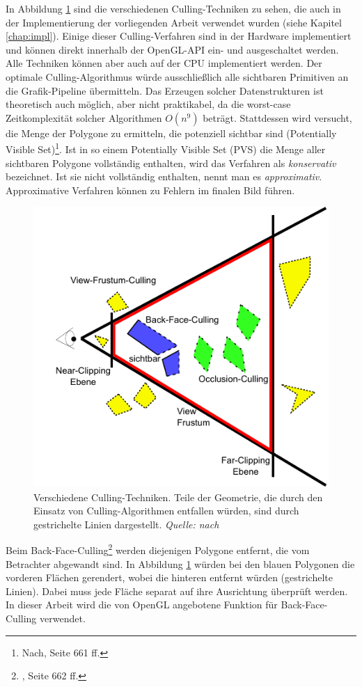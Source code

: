 In Abbildung \ref{fig:basics:culling} sind die verschiedenen Culling-Techniken zu sehen, die auch in der Implementierung der vorliegenden Arbeit verwendet wurden (siehe Kapitel \ref{chap:impl}).
Einige dieser Culling-Verfahren sind in der Hardware implementiert und können direkt innerhalb der OpenGL-API ein- und ausgeschaltet werden. Alle Techniken können aber auch auf der CPU implementiert werden. Der optimale Culling-Algorithmus würde ausschließlich alle sichtbaren Primitiven an die Grafik-Pipeline übermitteln. Das Erzeugen solcher Datenstrukturen ist theoretisch auch möglich, aber nicht praktikabel, da die worst-case Zeitkomplexität solcher Algorithmen $O(n^{9})$ beträgt. Stattdessen wird versucht, die Menge der Polygone zu ermitteln, die potenziell sichtbar sind (Potentially Visible Set)\footnote{Nach, Seite 661 ff.}. Ist in so einem Potentially Visible Set (PVS) die Menge aller sichtbaren Polygone vollständig enthalten, wird das Verfahren als \textit{konservativ} bezeichnet. Ist sie nicht vollständig enthalten, nennt man es \textit{approximativ}. Approximative Verfahren können zu Fehlern im finalen Bild führen.

\begin{figure}
  \centering
  \includegraphics[scale=0.8]{images/culling.pdf}
  \caption[Culling-Techniken]{Verschiedene Culling-Techniken. Teile der Geometrie, die durch den Einsatz von Culling-Algorithmen entfallen würden, sind durch gestrichelte Linien dargestellt. \textit{Quelle: nach} }
  \label{fig:basics:culling}
\end{figure}
Beim Back-Face-Culling\footnote{\cite{RTR3}, Seite 662 ff.} werden diejenigen Polygone entfernt, die vom Betrachter abgewandt sind. In Abbildung \ref{fig:basics:culling} würden bei den blauen Polygonen die vorderen Flächen gerendert, wobei die hinteren entfernt würden (gestrichelte Linien). Dabei muss jede Fläche separat auf ihre Ausrichtung überprüft werden. In dieser Arbeit wird die von OpenGL angebotene Funktion für Back-Face-Culling verwendet.


